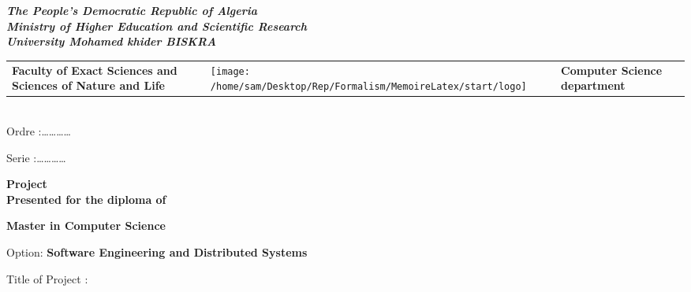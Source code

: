 \begin{titlepage}

\begin{center}
\textbf{\textsl{\large{}The People's Democratic Republic of Algeria}}\textbf{\textsl{\small{}}}\\
\textbf{\textsl{ Ministry of Higher Education and Scientific Research }}\textbf{\textsl{\small{}}}\\
\textbf{\textsl{  University Mohamed khider  {  \textendash{}
BISKRA}}}
\par\end{center}

\begin{tabular}{>{\centering}m{45mm}>{\centering}m{40mm}>{\centering}m{60mm}}
\centering{}\textbf{Faculty of Exact Sciences 
and Sciences of Nature and Life } & \centering
\hspace{5mm}
\texttt{[image: /home/sam/Desktop/Rep/Formalism/MemoireLatex/start/logo]} & \centering{}\textbf{Computer Science department}\tabularnewline
\end{tabular}\\


{\small{}Ordre :\dots \dots \dots \dots{} }{\small \par}

{\small{}Serie :\dots \dots \dots \dots{}}{\small \par}

\begin{center}
\textbf{Project}\\
\textbf{Presented for the diploma of }
\par\end{center}

\begin{center}
\textbf{\large{}Master in Computer Science }   
\par\end{center}

\begin{center}
Option: \textbf{Software Engineering and Distributed Systems }
\par\end{center}

\vspace*{10mm}

Title of Project :

\begin{center}
{\LARGE{}}%
\vspace*{10mm}


\end{center}
\end{titlepage}
